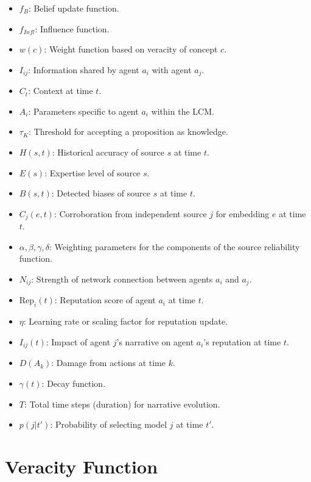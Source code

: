 \documentclass[12pt, a4paper]{article}
\begin{document}
\begin{itemize}
    \item \( f_B \): Belief update function.
    \item \( f_{Infl} \): Influence function.
    \item \( w(c) \): Weight function based on veracity of concept \( c \).
    \item \( I_{ij} \): Information shared by agent \( a_i \) with agent \( a_j \).
    \item \( C_t \): Context at time \( t \).
    \item \( A_i \): Parameters specific to agent \( a_i \) within the LCM.
    \item \( \tau_K \): Threshold for accepting a proposition as knowledge.
    \item \( H(s,t) \): Historical accuracy of source \(s\) at time \(t\).
    \item \( E(s) \): Expertise level of source \(s\).
    \item \( B(s,t) \): Detected biases of source \(s\) at time \(t\).
    \item \( C_j(e,t) \): Corroboration from independent source \(j\) for embedding \(e\) at time \(t\).
    \item \( \alpha, \beta, \gamma, \delta \): Weighting parameters for the components of the source reliability function.
    \item \( N_{ij} \): Strength of network connection between agents \( a_i \) and \( a_j \).
    \item \( \text{Rep}_i(t) \): Reputation score of agent \( a_i \) at time \( t \).
    \item \( \eta \): Learning rate or scaling factor for reputation update.
    \item \( I_{ij}(t) \): Impact of agent \( j \)'s narrative on agent \( a_i \)'s reputation at time \( t \).
    \item \( D(A_k) \): Damage from actions at time \( k \).
    \item \( \gamma(t) \): Decay function.
    \item \( T \):  Total time steps (duration) for narrative evolution.
    \item \( p(j|t') \): Probability of selecting model \( j \) at time \( t' \).
\end{itemize}

\section{Veracity Function}
\end{document}
